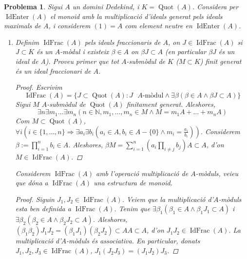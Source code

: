 \documentclass{article}
\DeclareMathOperator{\Quot}{Quot}
\DeclareMathOperator{\IdEnter}{IdEnter}
\DeclareMathOperator{\IdFrac}{IdFrac}
\newtheorem{problema}{Problema}
\begin{document}
\pagestyle{fancy}
\begin{problema}
    Sigui $A$ un domini Dedekind, i $K=\Quot(A)$. Considera per $\IdEnter(A)$ el monoid amb la multiplicació d'ideals generat pels ideals maximals de $A$, i considerem $(1)=A$ com element neutre en $\IdEnter(A)$.
    \begin{enumerate}
        \item Definim $\IdFrac(A)$ pels ideals fraccionaris de $A$, on $J\in\IdFrac(A)$ si $J\subset K$ és un $A$-mòdul i existeix $\beta\in A$ on $\beta J\subset A$ (en particular $\beta J$ és un ideal de A). Proveu primer que tot $A$-submòdul de $K$ ($M\subset K$) finit generat és un ideal fraccionari de $A$.
        \begin{proof}
            Escrivim
            \begin{equation*}
                \IdFrac(A)
                =\{J\subset\Quot(A):J\textrm{ $A$-mòdul}\land\exists\beta(\beta\in A\land\beta J\subset A)\}
            \end{equation*}
            Sigui $M$ $A$-submòdul de $\Quot(A)$ finitament generat. Aleshores,
            \begin{equation*}
                \exists n\exists m_{1}\ldots\exists m_{n}(n\in\mathbb{N},m_{1},\ldots,m_{n}\in M\land M=m_{1}A+\ldots+m_{n}A)
            \end{equation*}
            Com $M\subset\Quot(A)$, $\forall i(i\in\{1,\ldots,n\}\Rightarrow\exists a_{i}\exists b_{i}(a_{i}\in A,b_{i}\in A-\{0\}\land m_{i}=\tfrac{a_{i}}{b_{i}}))$. Considerem $\beta:=\prod_{i=1}^{n}b_{i}\in A$. Aleshores, $\beta M=\sum_{i=1}^{n}(a_{i}\prod_{i\neq j}b_{j})A\subset A$, d'on $M\in\IdFrac(A)$.
        \end{proof}
        Considerem $\IdFrac(A)$ amb l'operació multiplicació de $A$-mòduls, veieu que dóna a $\IdFrac(A)$ una estructura de monoid.
        \begin{proof}
            Siguin $J_{1},J_{2}\in\IdFrac(A)$. Veiem que la multiplicació d'$A$-mòduls esta ben definida a $\IdFrac(A)$. Tenim que $\exists\beta_{1}(\beta_{1}\in A\land\beta_{1}J_{1}\subset A)$ i $\exists\beta_{2}(\beta_{2}\in A\land\beta_{2}J_{2}\subset A)$. Aleshores, $(\beta_{1}\beta_{2})J_{1}J_{2}=(\beta_{1}J_{1})(\beta_{2}J_{2})\subset AA\subset A$, d'on $J_{1}J_{2}\in\IdFrac(A)$.\newline
            La multiplicació d'$A$-mòduls és associativa. En particular, donats $J_{1},J_{2},J_{3}\in\IdFrac(A)$, $J_{1}(J_{2}J_{3})=(J_{1}J_{2})J_{3}$.\newline

\end{proof}
\end{enumerate}
\end{problema}
\end{document}
